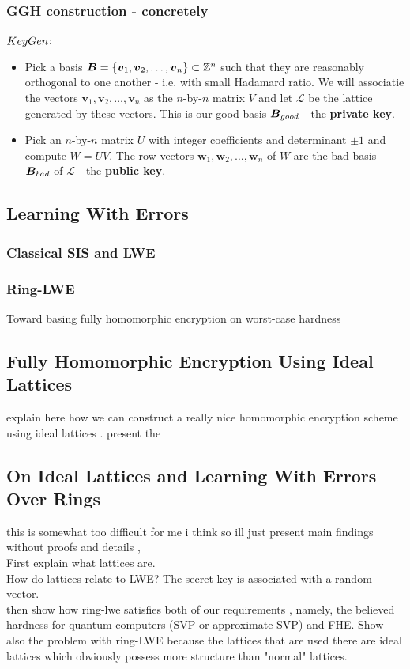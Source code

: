 \subsubsection*{GGH construction - concretely}
$\alg{KeyGen}$:
\begin{itemize}
    \item Pick a basis $\boldsymbol{B} = \{\boldsymbol{v}_1, \boldsymbol{v}_2, \dots, \boldsymbol{v}_n\} \subset \mathbb{Z}^n$ such that they are reasonably orthogonal to one another - i.e. with small Hadamard ratio. We will associatie the vectors $\bm{v}_1, \bm{v}_2, \dots, \bm{v}_n$ as the $n$-by-$n$ matrix $V$ and let $\mathcal{L}$ be the lattice generated by these vectors. This is our good basis $\boldsymbol{B}_{good}$ - the \textbf{private key}.
    \item Pick an $n$-by-$n$ matrix $U$ with integer coefficients and determinant $\pm 1$ and compute $W = UV$. The row vectors $\bm{w}_1, \bm{w}_2, \dots, \bm{w}_n$ of $W$ are the bad basis $\boldsymbol{B}_{bad}$ of $\mathcal{L}$ - the \textbf{public key}.
\end{itemize}

\subsection{Learning With Errors}
\subsubsection*{Classical SIS and LWE}
\subsubsection*{Ring-LWE}
\cite{ring-lwe} 
Toward basing fully homomorphic encryption on worst-case hardness

\subsection{Fully Homomorphic Encryption Using Ideal Lattices}
explain here how we can construct a really nice homomorphic encryption scheme using ideal lattices \cite{gentry}. present the 
\subsection{On Ideal Lattices and Learning With Errors Over Rings}
this is somewhat too difficult for me i think so ill just present main findings without proofs and details \cite{regev}, \\
First explain what lattices are. \\
How do lattices relate to LWE? The secret key is associated with a random vector. \\
then show how ring-lwe satisfies both of our requirements \cite{ring-lwe}, namely, the believed hardness for quantum computers (SVP or approximate SVP) and FHE. Show also the problem with ring-LWE because the lattices that are used there are ideal lattices which obviously possess more structure than "normal" lattices.
